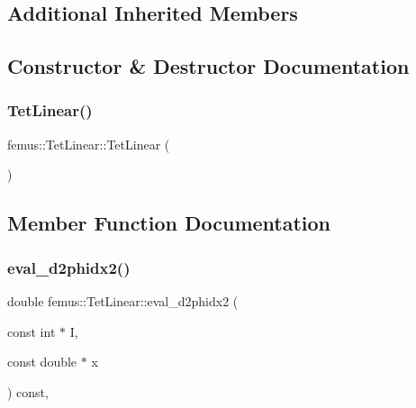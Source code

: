 \subsection*{Additional Inherited Members}


\subsection{Constructor \& Destructor Documentation}
\mbox{\label{classfemus_1_1_tet_linear_a32c02566d405cf5fbf1b9aa5430b3181}} 
\subsubsection{\texorpdfstring{Tet\+Linear()}{TetLinear()}}
{\footnotesize\ttfamily femus\+::\+Tet\+Linear\+::\+Tet\+Linear (\begin{DoxyParamCaption}{ }\end{DoxyParamCaption})\hspace{0.3cm}{\ttfamily [inline]}}



\subsection{Member Function Documentation}
\mbox{\label{classfemus_1_1_tet_linear_a7fea6490e2ca09cbd97ce31e4bb9ddef}} 
\subsubsection{\texorpdfstring{eval\+\_\+d2phidx2()}{eval\_d2phidx2()}}
{\footnotesize\ttfamily double femus\+::\+Tet\+Linear\+::eval\+\_\+d2phidx2 (\begin{DoxyParamCaption}\item[{const int $\ast$}]{I,  }\item[{const double $\ast$}]{x }\end{DoxyParamCaption}) const\hspace{0.3cm}{\ttfamily [inline]}, {\ttfamily [virtual]}}



